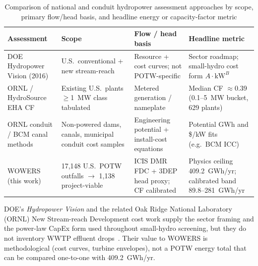 \documentclass[12pt,letterpaper]{report}
\begin{document}
\begin{table}[htbp]
  \centering
  \caption{Comparison of national and conduit hydropower assessment approaches by scope,
  primary flow/head basis, and headline energy or capacity-factor metric}
  \label{tab:prior_work}
  \begin{tabular}{@{}p{2.6cm}p{2.8cm}p{3.2cm}p{3.6cm}@{}}
    \toprule
    Assessment & Scope & Flow / head basis & Headline metric \\
    \midrule
    DOE Hydropower Vision (2016) & U.S.\ conventional + new stream-reach & Resource + cost
      curves; not POTW-specific & Sector roadmap; small-hydro cost form
      $A\cdot\mathrm{kW}^{B}$~\cite{doe_vision,ornl2014} \\
    ORNL / HydroSource EHA CF & Existing U.S.\ plants $\geq$1~MW class tabulated & Metered
      generation / nameplate & Median CF $\approx$0.39 (0.1--5~MW bucket,
      629 plants)~\cite{hydrosource_eha} \\
    ORNL conduit / BCM canal methods & Non-powered dams, canals, municipal conduit cost
      samples & Engineering potential + install-cost equations & Potential GWh and
      \$/kW fits (e.g.\ BCM ICC)~\cite{ornl2014,osti3002705} \\
    WOWERS (this work) & 17,148 U.S.\ POTW outfalls $\rightarrow$ 1,138 project-viable &
      ICIS DMR FDC + 3DEP head proxy; CF calibrated & Physics ceiling 409.2~GWh/yr;
      calibrated band 89.8--281~GWh/yr \\
    \bottomrule
  \end{tabular}
\end{table}

DOE's \emph{Hydropower Vision} and the related Oak Ridge National Laboratory (ORNL) New
Stream-reach Development cost work supply the sector framing and the power-law CapEx form
used throughout small-hydro screening, but they do not inventory WWTP effluent
drops~\cite{doe_vision,ornl2014}. Their value to WOWERS is methodological (cost curves,
turbine envelopes), not a POTW energy total that can be compared one-to-one with
409.2~GWh/yr.
\end{document}
